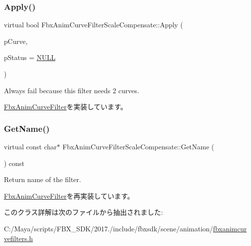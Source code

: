\subsubsection{\texorpdfstring{Apply()}{Apply()}\hspace{0.1cm}{\footnotesize\ttfamily [6/6]}}
{\footnotesize\ttfamily virtual bool Fbx\+Anim\+Curve\+Filter\+Scale\+Compensate\+::\+Apply (\begin{DoxyParamCaption}\item[{\hyperlink{class_fbx_anim_curve}{Fbx\+Anim\+Curve} \&}]{p\+Curve,  }\item[{\hyperlink{class_fbx_status}{Fbx\+Status} $\ast$}]{p\+Status = {\ttfamily \hyperlink{fbxarch_8h_a070d2ce7b6bb7e5c05602aa8c308d0c4}{N\+U\+LL}} }\end{DoxyParamCaption})\hspace{0.3cm}{\ttfamily [virtual]}}

Always fail because this filter needs 2 curves. 

\hyperlink{class_fbx_anim_curve_filter_a6a69996c47c0e6f63a0f8b0d5fa806a0}{Fbx\+Anim\+Curve\+Filter}を実装しています。

\mbox{\label{class_fbx_anim_curve_filter_scale_compensate_af6564ed47826563b148a2c41901e4f03}} 
\subsubsection{\texorpdfstring{Get\+Name()}{GetName()}}
{\footnotesize\ttfamily virtual const char$\ast$ Fbx\+Anim\+Curve\+Filter\+Scale\+Compensate\+::\+Get\+Name (\begin{DoxyParamCaption}{ }\end{DoxyParamCaption}) const\hspace{0.3cm}{\ttfamily [virtual]}}



Return name of the filter. 



\hyperlink{class_fbx_anim_curve_filter_abd559d5052fbb072042e59241940a35c}{Fbx\+Anim\+Curve\+Filter}を再実装しています。



このクラス詳解は次のファイルから抽出されました\+:\begin{DoxyCompactItemize}
\item 
C\+:/\+Maya/scripts/\+F\+B\+X\+\_\+\+S\+D\+K/2017./include/fbxsdk/scene/animation/\hyperlink{fbxanimcurvefilters_8h}{fbxanimcurvefilters.\+h}\end{DoxyCompactItemize}
